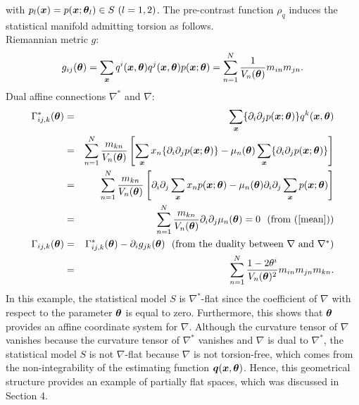 \documentclass[graybox]{svmult}
\newcommand{\bm}[1]{\mbox{\boldmath $#1$}}
\newcommand{\bms}[1]{\mbox{\scriptsize\boldmath $#1$}}
\begin{document}
%
with $p_l(\bm{x})=p(\bm{x};\bm{\theta}_l) \in S \ (l=1,2)$.
The pre-contrast function $\rho_q$ induces the statistical manifold admitting torsion as follows. \\
%
Riemannian metric $g$:
%
\begin{eqnarray*}
   g_{ij}(\bm{\theta}) = \sum_{\bms{x}}q^i(\bm{x},\bm{\theta})q^j(\bm{x},\bm{\theta})p(\bm{x};\bm{\theta})
                       = \sum_{n=1}^{N}\frac{1}{V_n(\bm{\theta})}m_{in}m_{jn}.
\end{eqnarray*}
%
Dual affine connections $\nabla^{\ast}$ and $\nabla$:
%
\begin{eqnarray*}
   \Gamma_{ij,k}^{\ast}(\bm{\theta}) &=& \sum_{\bms{x}}\{\partial_i\partial_jp(\bm{x};\bm{\theta})\}
                                         q^k(\bm{x},\bm{\theta}) \\
                                     &=& \sum_{n=1}^{N}\frac{m_{kn}}{V_n(\bm{\theta})}
                                         \left[\sum_{\bms{x}}x_n\{\partial_i\partial_jp(\bm{x};\bm{\theta})\}
                                         - \mu_n(\bm{\theta})\sum_{\bms{x}}\{\partial_i\partial_jp(\bm{x};\bm{\theta})\}
                                         \right] \\
                                     &=& \sum_{n=1}^{N}\frac{m_{kn}}{V_n(\bm{\theta})}
                                         \left[\partial_i\partial_j\sum_{\bms{x}}x_np(\bm{x};\bm{\theta})
                                         - \mu_n(\bm{\theta})\partial_i\partial_j\sum_{\bms{x}}p(\bm{x};\bm{\theta})
                                         \right] \\
                                     &=& \sum_{n=1}^{N}\frac{m_{kn}}{V_n(\bm{\theta})}\partial_i\partial_j\mu_n(\bm{\theta})
                                      = 0 \vspace{2mm} \ \ (\mbox{from (\ref{mean})}) \\
   \Gamma_{ij,k}(\bm{\theta}) &=& \Gamma_{ij,k}^{\ast}(\bm{\theta}) - \partial_ig_{jk}(\bm{\theta}) \ \ 
                                  (\mbox{from the duality between $\nabla$ and $\nabla^{\ast}$}) \\
                              &=& \sum_{n=1}^{N}\frac{1-2\theta^i}{V_n(\bm{\theta})^2}m_{in}m_{jn}m_{kn}.
\end{eqnarray*}
%
In this example, the statistical model $S$ is $\nabla^{\ast}$-flat since the coefficient of $\nabla$ 
with respect to the parameter $\bm{\theta}$ is equal to zero.
Furthermore, this shows that $\bm{\theta}$ provides an affine coordinate system for $\nabla$.
Although the curvature tensor of $\nabla$ vanishes because the curvature tensor of $\nabla^{\ast}$
vanishes and $\nabla$ is dual to $\nabla^{\ast}$, the statistical model $S$ is not $\nabla$-flat 
because $\nabla$ is not torsion-free, which comes from the non-integrability of the estimating 
function $\bm{q}(\bm{x},\bm{\theta})$.
Hence, this geometrical structure provides an example of partially flat spaces, which was discussed
in Section 4.
\end{document}
